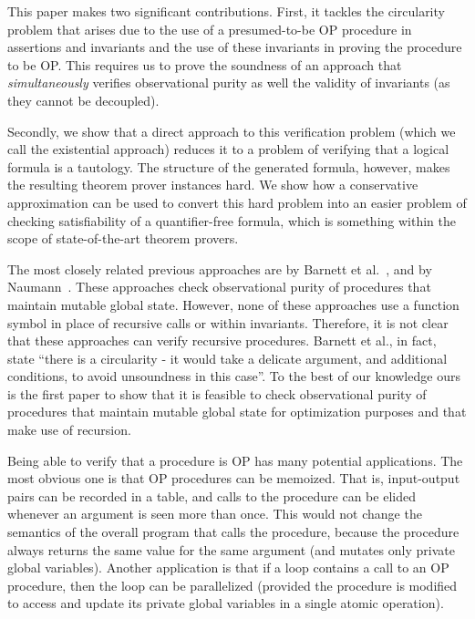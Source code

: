 This paper makes two significant contributions. First, it tackles the
circularity problem that arises due to the use of a presumed-to-be OP
procedure in assertions and invariants and the use of these invariants in
proving the procedure to be OP. This requires us to prove the soundness of
an approach that \emph{simultaneously} verifies observational purity as well the validity of
invariants (as they cannot be decoupled).

Secondly, we show that a direct approach to this verification problem (which we
call the existential approach) reduces it to a problem of verifying that a logical formula
is a tautology. The structure of the generated formula, however, makes the resulting
theorem prover instances hard. We show how a conservative approximation can be
used to convert this hard problem into an easier problem of checking satisfiability
of a quantifier-free formula, which is something within the scope of state-of-the-art theorem
provers.


The most closely related previous approaches are by Barnett et
al.~\cite{barnett200499,barnett2006allowing}, and by
Naumann~\cite{naumann2007observational}.  These approaches check observational
purity of procedures that maintain mutable global state. However, none of
these approaches use a function symbol in place of recursive calls or
within invariants. Therefore, it is not clear that these approaches can
verify recursive procedures. 
Barnett et al., in fact, state ``there is a circularity - it would take a delicate argument, and additional conditions,
to avoid unsoundness in this case''.
To the best of our knowledge ours is the first paper to show that it is
feasible to check observational purity of procedures that maintain mutable
global state for optimization purposes and that make use of recursion.


Being able to verify that a procedure is OP has many potential
applications. The most obvious one is that OP procedures can be
memoized. That is, input-output pairs can be recorded in a table, and calls
to the procedure can be elided whenever an argument is seen more than
once. This would not change the semantics of the overall program that calls
the procedure, because the procedure always returns the same value for the
same argument (and mutates only private global variables). Another
application is that if a loop contains a call to an OP procedure, then the
loop can be parallelized (provided the procedure is modified to access and
update its private global variables in a single atomic operation).

